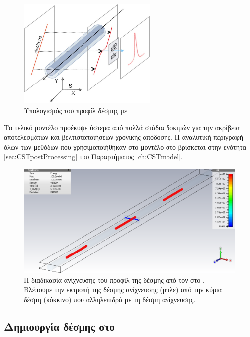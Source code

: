 \begin{figure}[tph]
\includegraphics[width=0.6\textwidth]{figures/EBS-profile-calculation}
\centering
\caption{Υπολογισμός του προφίλ δέσμης με }
\label{fig:EBS-profile-calculation}
\end{figure}

Το τελικό μοντέλο προέκυψε ύστερα από πολλά στάδια δοκιμών για την ακρίβεια αποτελεσμάτων και βελτιστοποιήσεων χρονικής απόδοσης.
Η αναλυτική περιγραφή όλων των μεθόδων  που χρησιμοποιήθηκαν στο μοντέλο στο  βρίσκεται στην ενότητα \ref{sec:CSTpostProcessing} του Παραρτήματος \ref{ch:CSTmodel}.

\begin{figure}[tbh]
\includegraphics[width=\textwidth]{figures/CST-EBS-implementation/CST-multi-bunch-EBS-detection}
\centering
\caption[Η διαδικασία ανίχνευσης του προφίλ της δέσμης από τον  στο ]
{Η διαδικασία ανίχνευσης του προφίλ της δέσμης από τον  στο .
Βλέπουμε την εκτροπή της δέσμης ανίχνευσης (μπλε) από την κύρια δέσμη (κόκκινο) που αλληλεπιδρά με τη δέσμη ανίχνευσης.}
\label{fig:CST-MultiBunchEBSDetection}
\end{figure}

\subsection{Δημιουργία  δέσμης στο }


